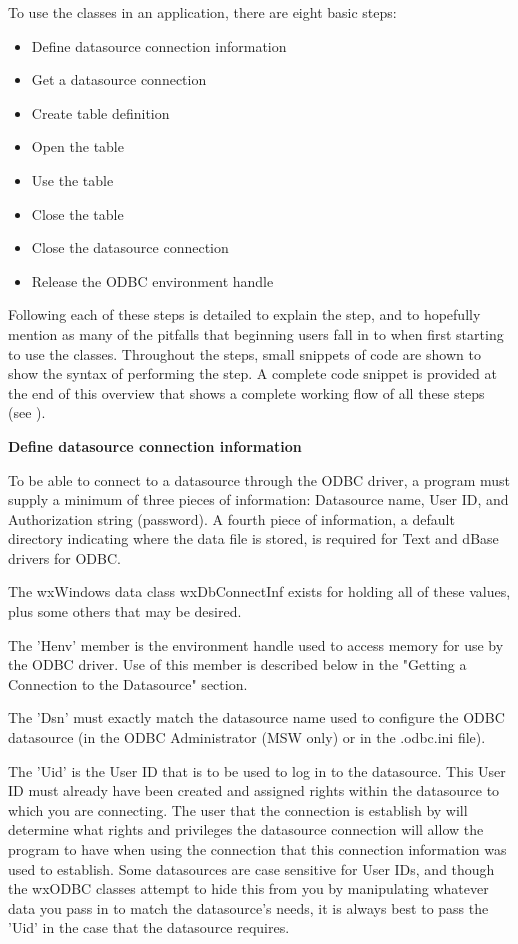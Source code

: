 To use the classes in an application, there are eight basic steps:

\begin{itemize}\itemsep=0pt
\item Define datasource connection information
\item Get a datasource connection
\item Create table definition
\item Open the table
\item Use the table
\item Close the table
\item Close the datasource connection
\item Release the ODBC environment handle
\end{itemize}

Following each of these steps is detailed to explain the step, and to 
hopefully mention as many of the pitfalls that beginning users fall in 
to when first starting to use the classes.  Throughout the steps, small 
snippets of code are shown to show the syntax of performing the step.  A 
complete code snippet is provided at the end of this overview that shows a 
complete working flow of all these steps (see 
).


{\bf Define datasource connection information}

To be able to connect to a datasource through the ODBC driver, a program must 
supply a minimum of three pieces of information: Datasource name, User ID, and 
Authorization string (password).  A fourth piece of information, a default 
directory indicating where the data file is stored, is required for Text and 
dBase drivers for ODBC.

The wxWindows data class wxDbConnectInf exists for holding all of these 
values, plus some others that may be desired.

The 'Henv' member is the environment handle used to access memory for use by the 
ODBC driver.  Use of this member is described below in the "Getting a Connection 
to the Datasource" section.

The 'Dsn' must exactly match the datasource name used to configure the ODBC 
datasource (in the ODBC Administrator (MSW only) or in the .odbc.ini file).

The 'Uid' is the User ID that is to be used to log in to the datasource.  This 
User ID must already have been created and assigned rights within the 
datasource to which you are connecting.  The user that the connection is 
establish by will determine what rights and privileges the datasource 
connection will allow the program to have when using the connection that 
this connection information was used to establish.  Some datasources are 
case sensitive for User IDs, and though the wxODBC classes attempt to hide 
this from you by manipulating whatever data you pass in to match the 
datasource's needs, it is always best to pass the 'Uid' in the case that 
the datasource requires.

